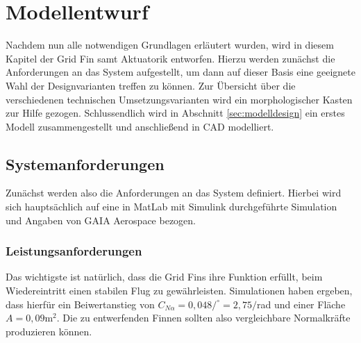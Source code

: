 \chapter{Modellentwurf}\label{sec:modellentwurf}
Nachdem nun alle notwendigen Grundlagen erläutert wurden, wird in diesem Kapitel der Grid Fin samt Aktuatorik entworfen. Hierzu werden zunächst die Anforderungen an das System aufgestellt, um dann auf dieser Basis eine geeignete Wahl der Designvarianten treffen zu können. Zur Übersicht über die verschiedenen technischen Umsetzungsvarianten wird ein morphologischer Kasten zur Hilfe gezogen. Schlussendlich wird in Abschnitt \ref{sec:modelldesign} ein erstes Modell zusammengestellt und anschließend in CAD modelliert.
\section{Systemanforderungen}
Zunächst werden also die Anforderungen an das System definiert. Hierbei wird sich hauptsächlich auf eine in MatLab mit Simulink durchgeführte Simulation und Angaben von GAIA Aerospace bezogen.
\subsection{Leistungsanforderungen}
Das wichtigste ist natürlich, dass die Grid Fins ihre Funktion erfüllt, beim Wiedereintritt einen stabilen Flug zu gewährleisten. Simulationen haben ergeben, dass hierfür ein Beiwertanstieg von $C_{N\alpha} =0,048/^\circ=2,75/$rad und einer Fläche $A=0,09\mathrm{m}^2$. Die zu entwerfenden Finnen sollten also vergleichbare Normalkräfte produzieren können.


